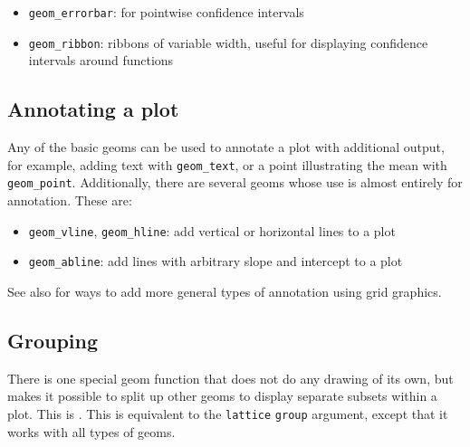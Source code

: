 \begin{itemize}
	\item {\tt geom\_errorbar}: for pointwise confidence intervals
	\item {\tt geom\_ribbon}: ribbons of variable width, useful for displaying confidence intervals around functions
\end{itemize}

\subsection{Annotating a plot}\label{sub:annotating_a_plot}

Any of the basic geoms can be used to annotate a plot with additional output, for example, adding text with {\tt geom\_text}, or a point illustrating the mean with {\tt geom\_point}.  Additionally, there are several geoms whose use is almost entirely for annotation.  These are:

\begin{itemize}
	\item {\tt geom\_vline}, {\tt geom\_hline}: add vertical or horizontal lines to a plot
	\item {\tt geom\_abline}: add lines with arbitrary slope and intercept to a plot
\end{itemize}

See also  for ways to add more general types of annotation using grid graphics.

\subsection{Grouping}\label{sub:grouping}

There is one special geom function that does not do any drawing of its own, but makes it possible to split up other geoms to display separate subsets within a plot.  This is .  This is equivalent to the {\tt lattice} {\tt group} argument, except that it works with all types of geoms.  



